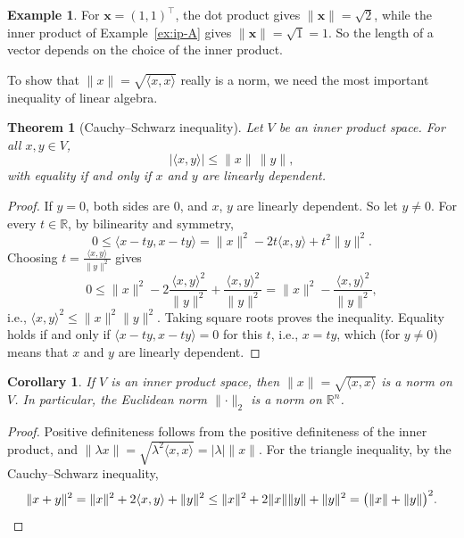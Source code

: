 \documentclass[11pt]{article}
\newcommand{\norm}[1]{\lVert #1 \rVert}
\newcommand{\ip}[2]{\langle #1, #2 \rangle}
\theoremstyle{definition}
\newtheorem{example}[definition]{Example}
\theoremstyle{plain}
\newtheorem{theorem}[definition]{Theorem}
\newtheorem{corollary}[definition]{Corollary}
\theoremstyle{remark}
\begin{document}
\begin{example}
    For $\mathbf{x} = (1, 1)^\top$, the dot product gives $\norm{\mathbf{x}} = \sqrt{2}$, while the inner product of Example~\ref{ex:ip-A} gives $\norm{\mathbf{x}} = \sqrt{1} = 1$. So the length of a vector depends on the choice of the inner product.
\end{example}

To show that $\norm{x} = \sqrt{\ip{x}{x}}$ really is a norm, we need the most important inequality of linear algebra.

\begin{theorem}[Cauchy--Schwarz inequality]\label{thm:cauchy-schwarz}
    Let $V$ be an inner product space. For all $x, y \in V$,
    \[|\ip{x}{y}| \leq \norm{x} \, \norm{y},\]
    with equality if and only if $x$ and $y$ are linearly dependent.
\end{theorem}

\begin{proof}
    If $y = 0$, both sides are $0$, and $x$, $y$ are linearly dependent. So let $y \neq 0$. For every $t \in \mathbb{R}$, by bilinearity and symmetry,
    \[0 \leq \ip{x - ty}{x - ty} = \norm{x}^2 - 2t \ip{x}{y} + t^2 \norm{y}^2.\]
    Choosing $t = \frac{\ip{x}{y}}{\norm{y}^2}$ gives
    \[0 \leq \norm{x}^2 - 2\frac{\ip{x}{y}^2}{\norm{y}^2} + \frac{\ip{x}{y}^2}{\norm{y}^2} = \norm{x}^2 - \frac{\ip{x}{y}^2}{\norm{y}^2},\]
    i.e., $\ip{x}{y}^2 \leq \norm{x}^2 \norm{y}^2$. Taking square roots proves the inequality. Equality holds if and only if $\ip{x - ty}{x - ty} = 0$ for this $t$, i.e., $x = ty$, which (for $y \neq 0$) means that $x$ and $y$ are linearly dependent.
\end{proof}

\begin{corollary}\label{cor:induced-norm}
    If $V$ is an inner product space, then $\norm{x} = \sqrt{\ip{x}{x}}$ is a norm on $V$. In particular, the Euclidean norm $\norm{\cdot}_2$ is a norm on $\mathbb{R}^n$.
\end{corollary}

\begin{proof}
    Positive definiteness follows from the positive definiteness of the inner product, and $\norm{\lambda x} = \sqrt{\lambda^2 \ip{x}{x}} = |\lambda| \norm{x}$. For the triangle inequality, by the Cauchy--Schwarz inequality,
    \[\norm{x + y}^2 = \norm{x}^2 + 2 \ip{x}{y} + \norm{y}^2 \leq \norm{x}^2 + 2 \norm{x} \norm{y} + \norm{y}^2 = \big(\norm{x} + \norm{y}\big)^2. \qedhere\]
\end{proof}
\end{document}
